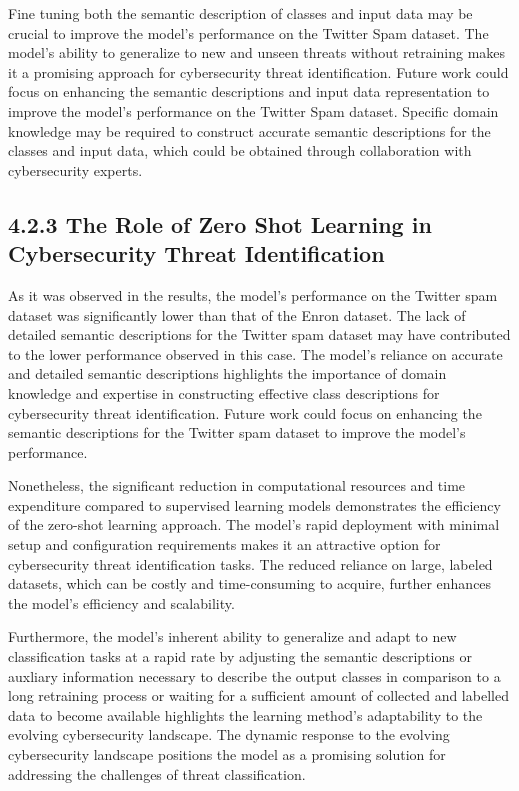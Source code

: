 \documentclass[letterpaper,twocolumn,fleqn]{article}
\begin{document}
Fine tuning both the semantic description of classes and input data may be crucial to improve the model's performance on the Twitter Spam dataset. The model's ability to generalize to new and unseen threats without retraining makes it a promising approach for cybersecurity threat identification. Future work could focus on enhancing the semantic descriptions and input data representation to improve the model's performance on the Twitter Spam dataset. Specific domain knowledge may be required to construct accurate semantic descriptions for the classes and input data, which could be obtained through collaboration with cybersecurity experts.

\subsection*{4.2.3 The Role of Zero Shot Learning in Cybersecurity Threat Identification}
As it was observed in the results, the model's performance on the Twitter spam dataset was significantly lower than that of the Enron dataset. The lack of detailed semantic descriptions for the Twitter spam dataset may have contributed to the lower performance observed in this case. The model's reliance on accurate and detailed semantic descriptions highlights the importance of domain knowledge and expertise in constructing effective class descriptions for cybersecurity threat identification. Future work could focus on enhancing the semantic descriptions for the Twitter spam dataset to improve the model's performance.

Nonetheless, the significant reduction in computational resources and time expenditure compared to supervised learning models demonstrates the efficiency of the zero-shot learning approach. The model's rapid deployment with minimal setup and configuration requirements makes it an attractive option for cybersecurity threat identification tasks. The reduced reliance on large, labeled datasets, which can be costly and time-consuming to acquire, further enhances the model's efficiency and scalability.

Furthermore, the model's inherent ability to generalize and adapt to new classification tasks at a rapid rate by adjusting the semantic descriptions or auxliary information necessary to describe the output classes in comparison to a long retraining process or waiting for a sufficient amount of collected and labelled data to become available highlights the learning method's adaptability to the evolving cybersecurity landscape. The dynamic response to the evolving cybersecurity landscape positions the model as a promising solution for addressing the challenges of threat classification.
\end{document}
